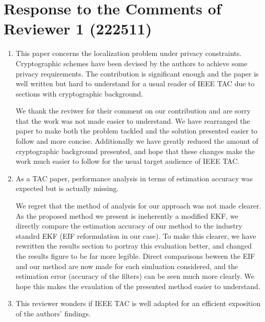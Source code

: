 \documentclass[a4paper]{scrartcl}
\newenvironment{rebuttal}{\begin{enumerate}[label={\color{grey}\thesection.\arabic{enumi}},leftmargin=0pt,ref=\thesection.\arabic{enumi}]}{\end{enumerate}}
\newcommand{\reviewtext}[1]{{\color{nblue} #1}}
\begin{document}



\section*{Response to the Comments of Reviewer 1 (222511)}
\def\thesection{R1}
\begin{rebuttal}
\item \reviewtext{This paper concerns the localization problem under privacy constraints. Cryptographic schemes have been devised by the authors to achieve some privacy requirements. The contribution is significant enough and the paper is well written but hard to understand for a usual reader of IEEE TAC due to sections with cryptographic background.}

We thank the reviwer for their comment on our contribution and are sorry that the work was not made easier to understand. We have rearranged the paper to make both the problem tackled and the solution presented easier to follow and more concise. Additionally we have greatly reduced the amount of cryptographic background presented, and hope that these changes make the work much easier to follow for the usual target audience of IEEE TAC.

\item \reviewtext{As a TAC paper, performance analysis in terms of estimation accuracy was expected but is actually missing.}

We regret that the method of analysis for our approach was not made clearer. As the proposed method we present is ineherently a modified EKF, we directly compare the estimation accuracy of our method to the industry standrd EKF (EIF reformulation in our case). To make this clearer, we have rewritten the results section to portray this evaluation better, and changed the results figure to be far more legible. Direct comparisons beween the EIF and our method are now made for each simluation considered, and the estimation error (accuracy of the filters) can be seen much more clearly. We hope this makes the evaulation of the presented method easier to understand.

\item \reviewtext{This reviewer wonders if IEEE TAC is well adapted for an efficient exposition of the authors' findings.}


\end{rebuttal}
\end{document}
